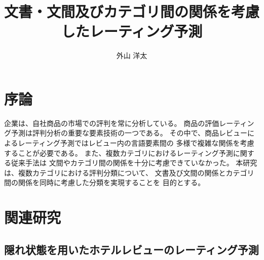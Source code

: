 \documentclass{ttisummary}
\title{文書・文間及びカテゴリ間の関係を考慮したレーティング予測}
\author{外山 洋太}
\begin{document}
\section{序論}




企業は、自社商品の市場での評判を常に分析している。
商品の評価レーティング予測は評判分析の重要な要素技術の一つである。
その中で、商品レビューによるレーティング予測ではレビュー内の言語要素間の
多様で複雑な関係を考慮することが必要である。
また、複数カテゴリにおけるレーティング予測に関する従来手法は
文間やカテゴリ間の関係を十分に考慮できていなかった。
本研究は、複数カテゴリにおける評判分類について、
文書及び文間の関係とカテゴリ間の関係を同時に考慮した分類を実現することを
目的とする。



\section{関連研究}

\subsection{隠れ状態を用いたホテルレビューのレーティング予測}
\end{document}
